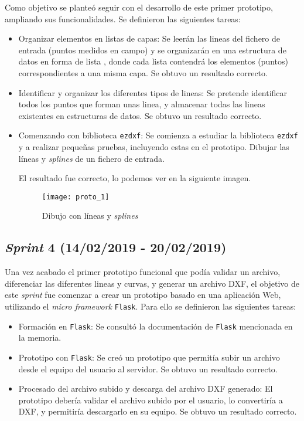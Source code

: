 Como objetivo se planteó seguir con el desarrollo de este primer prototipo, ampliando sus funcionalidades. Se definieron las siguientes tareas:

\begin{itemize}
\item Organizar elementos en listas de capas: Se leerán las lineas del fichero de entrada (puntos medidos en campo) y se organizarán en una estructura de datos en forma de lista , donde cada lista contendrá los elementos (puntos) correspondientes a una misma capa. Se obtuvo un resultado correcto.

\item Identificar y organizar los diferentes tipos de lineas: Se pretende identificar todos los puntos que forman unas linea, y almacenar todas las lineas existentes en estructuras de datos. Se obtuvo un resultado correcto.

\item Comenzando con biblioteca \texttt{ezdxf}: Se comienza a estudiar la biblioteca \texttt{ezdxf} y a realizar pequeñas pruebas, incluyendo estas en el prototipo. Dibujar las líneas y \emph{splines} de un fichero de entrada.

El resultado fue correcto, lo podemos ver en la siguiente imagen.
\begin{figure}[H]
	\centering
	\texttt{[image: proto\_1]}
	\caption{Dibujo con líneas y \emph{splines}}
	\label{fig:proto_1}
\end{figure}
\end{itemize}




\subsection{\emph{Sprint} 4 (14/02/2019 - 20/02/2019)}

Una vez acabado el primer prototipo funcional que podía validar un archivo, diferenciar las diferentes lineas y curvas, y generar un archivo DXF, el objetivo de este \emph{sprint} fue comenzar a crear un prototipo  basado en una aplicación Web, utilizando el \emph{micro framework} \texttt{Flask}. Para ello se definieron las siguientes tareas:

\begin{itemize}
\item Formación en \texttt{Flask}: Se consultó la documentación de \texttt{Flask} mencionada en la memoria.

\item Prototipo con \texttt{Flask}: Se creó un prototipo que permitía subir un archivo desde el equipo del usuario al servidor. Se obtuvo un resultado correcto.

\item Procesado del archivo subido y descarga del archivo DXF generado: El prototipo debería validar el archivo subido por el usuario, lo convertiría a DXF, y permitiría descargarlo en su equipo. Se obtuvo un resultado correcto.

\end{itemize}
 
